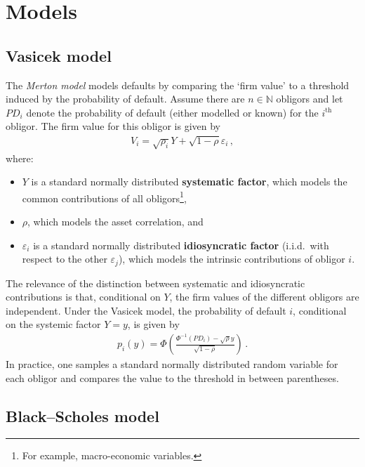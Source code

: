     \begin{theorem}
    \end{theorem}

\section{Models}
\subsection{Vasicek model}

    The \textit{Merton model} models defaults by comparing the `firm value' to a threshold induced by the probability of default. Assume there are $n\in\mathbb{N}$ obligors and let $PD_i$ denote the probability of default (either modelled or known) for the $i^{\text{th}}$ obligor. The firm value for this obligor is given by
    \begin{gather}
        V_i = \sqrt{\rho_i}Y + \sqrt{1-\rho}\varepsilon_i\,,
    \end{gather}
    where:
    \begin{itemize}
        \item $Y$ is a standard normally distributed \textbf{systematic factor}, which models the common contributions of all obligors\footnote{For example, macro-economic variables.},
        \item $\rho$, which models the asset correlation, and
        \item $\varepsilon_i$ is a standard normally distributed \textbf{idiosyncratic factor} (i.i.d.~with respect to the other $\varepsilon_j$), which models the intrinsic contributions of obligor $i$.
    \end{itemize}
    The relevance of the distinction between systematic and idiosyncratic contributions is that, conditional on $Y$, the firm values of the different obligors are independent. Under the Vasicek model, the probability of default $i$, conditional on the systemic factor $Y=y$, is given by
    \begin{gather}
        p_i(y) = \Phi\left(\frac{\Phi^{-1}(PD_i)-\sqrt{\rho}y}{\sqrt{1-\rho}}\right)\,.
    \end{gather}
    In practice, one samples a standard normally distributed random variable for each obligor and compares the value to the threshold in between parentheses.

\subsection{Black--Scholes model}

